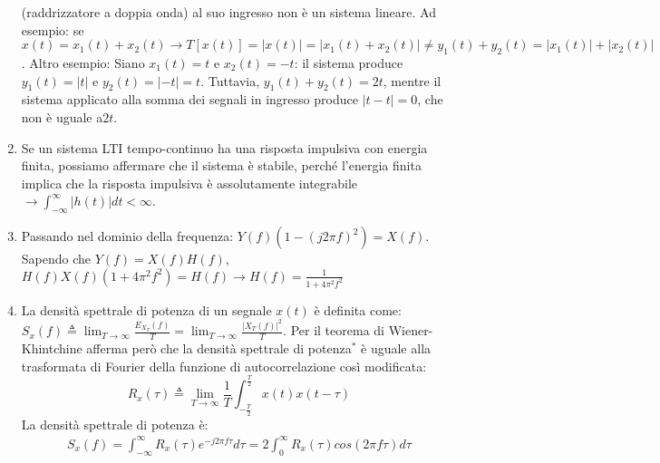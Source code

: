 \documentclass[
]{article}
\begin{document}
\begin{enumerate}
  (raddrizzatore a doppia onda) al suo ingresso non è un sistema
  lineare. Ad esempio: se
  \(\displaystyle x(t)=  x_1(t)+x_2(t) \to T[x(t)]  = |x(t)| = |x_1(t)+x_2(t)| \neq y_1(t)+y_2(t) = |x_1(t)|+|x_2(t)|\).
  Altro esempio: Siano \(x_1(t) = t\) e \(x_2(t) = -t\): il sistema
  produce \(y_1(t) = |t|\) e \(y_2(t) = |-t| = t\). Tuttavia,
  \(y_1(t) + y_2(t) = 2t\), mentre il sistema applicato alla somma dei
  segnali in ingresso produce \(|t - t| = 0\), che non è uguale a\(2t\).
\item
  Se un sistema LTI tempo-continuo ha una risposta impulsiva con energia
  finita, possiamo affermare che il sistema è stabile, perché l'energia
  finita implica che la risposta impulsiva è assolutamente integrabile
  \(\to  \displaystyle \int_{-\infty}^\infty |h(t)| dt < \infty\).
\item
  Passando nel dominio della frequenza:
  \(\displaystyle Y(f)(1-(j2\pi f)^2)=X(f)\). Sapendo che
  \(Y(f)=X(f)H(f)\),
  \(\displaystyle H(f)X(f)(1+4\pi^2 f^2)=H(f) \to H(f)=\frac{1}{1+4\pi^2 f^2}\)
\item
  La densità spettrale di potenza di un segnale \(x(t)\) è definita
  come:
  \(\displaystyle S_x(f) \triangleq \lim_{T \to \infty} \frac{E_{X_T}(f)}{T} = \lim_{T \to \infty} \frac{|X_T(f)|^2}{T}\).
  Per il teorema di Wiener-Khintchine afferma però che la densità
  spettrale di potenza\(^*\) è uguale alla trasformata di Fourier della
  funzione di autocorrelazione così modificata: \[
  R_x(\tau) \triangleq  \lim_{T \to \infty} \frac{1}{T} \int_{-\frac{T}{2}}^{\frac{T}{2}}x(t)x(t-\tau)
  \] La densità spettrale di potenza è:
  \begin{gather*}\displaystyle S_x(f)= \int_{-\infty}^{\infty} R_x(\tau)e^{-j2 \pi f \tau} d\tau = 2\int_{0}^{\infty}  R_x(\tau) cos(2 \pi f \tau) d\tau
  \end{gather*}
\end{enumerate}
\end{document}
